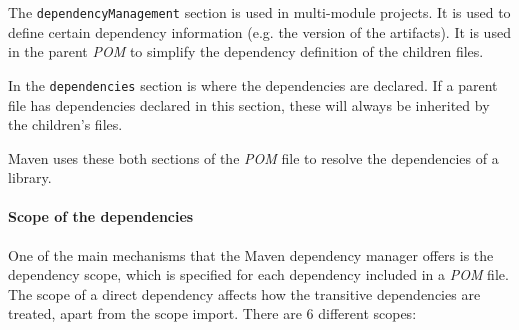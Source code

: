 The \texttt{dependencyManagement} section is used in multi-module projects. It is used to define certain dependency information (e.g. the version of the artifacts). It is used in the parent \textit{POM} to simplify the dependency definition of the children files.

In the \texttt{dependencies} section is where the dependencies are declared. If a parent file has dependencies declared in this section, these will always be inherited by the children's files.

Maven uses these both sections of the \textit{POM} file to resolve the dependencies of a library.

\paragraph{Scope of the dependencies}
One of the main mechanisms that the Maven dependency manager offers is the dependency scope, which is specified for each dependency included in a \textit{POM} file. The scope of a direct dependency affects how the transitive dependencies are treated, apart from the scope import. There are 6 different scopes:


